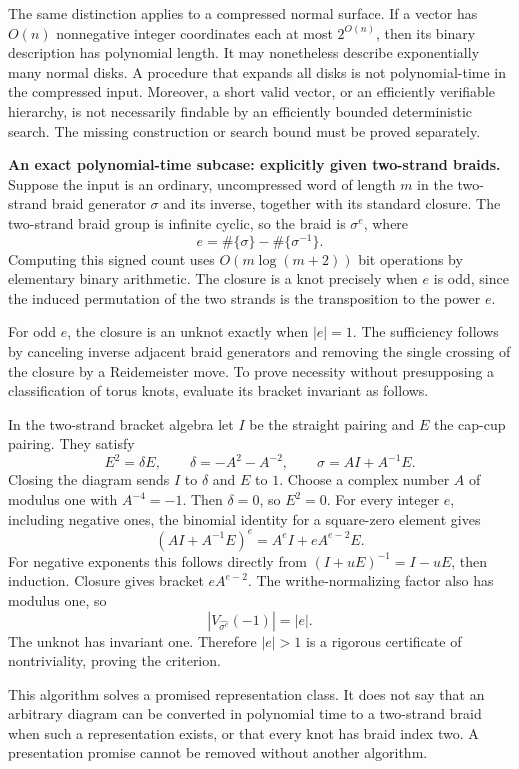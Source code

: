\documentclass[11pt]{article}
\begin{document}
The same distinction applies to a compressed normal surface. If a vector has $O(n)$ nonnegative integer coordinates each at most $2^{O(n)}$, then its binary description has polynomial length. It may nonetheless describe exponentially many normal disks. A procedure that expands all disks is not polynomial-time in the compressed input. Moreover, a short valid vector, or an efficiently verifiable hierarchy, is not necessarily findable by an efficiently bounded deterministic search. The missing construction or search bound must be proved separately.

\textbf{An exact polynomial-time subcase: explicitly given two-strand braids.} Suppose the input is an ordinary, uncompressed word of length $m$ in the two-strand braid generator $\sigma$ and its inverse, together with its standard closure. The two-strand braid group is infinite cyclic, so the braid is $\sigma^e$, where
\[
 e=\#\{\sigma\}-\#\{\sigma^{-1}\}.
\]
Computing this signed count uses $O(m\log(m+2))$ bit operations by elementary binary arithmetic. The closure is a knot precisely when $e$ is odd, since the induced permutation of the two strands is the transposition to the power $e$.

For odd $e$, the closure is an unknot exactly when $|e|=1$. The sufficiency follows by canceling inverse adjacent braid generators and removing the single crossing of the closure by a Reidemeister move. To prove necessity without presupposing a classification of torus knots, evaluate its bracket invariant as follows.

In the two-strand bracket algebra let $I$ be the straight pairing and $E$ the cap-cup pairing. They satisfy
\[
 E^2=\delta E,\qquad \delta=-A^2-A^{-2},
 \qquad \sigma=A I+A^{-1}E.
\]
Closing the diagram sends $I$ to $\delta$ and $E$ to $1$. Choose a complex number $A$ of modulus one with $A^{-4}=-1$. Then $\delta=0$, so $E^2=0$. For every integer $e$, including negative ones, the binomial identity for a square-zero element gives
\[
 (A I+A^{-1}E)^e=A^e I+eA^{e-2}E.
\]
For negative exponents this follows directly from $(I+uE)^{-1}=I-uE$, then induction. Closure gives bracket $eA^{e-2}$. The writhe-normalizing factor also has modulus one, so
\[
 |V_{\widehat{\sigma^e}}(-1)|=|e|.
 \tag{317.2}
\]
The unknot has invariant one. Therefore $|e|>1$ is a rigorous certificate of nontriviality, proving the criterion.

This algorithm solves a promised representation class. It does not say that an arbitrary diagram can be converted in polynomial time to a two-strand braid when such a representation exists, or that every knot has braid index two. A presentation promise cannot be removed without another algorithm.
\end{document}
